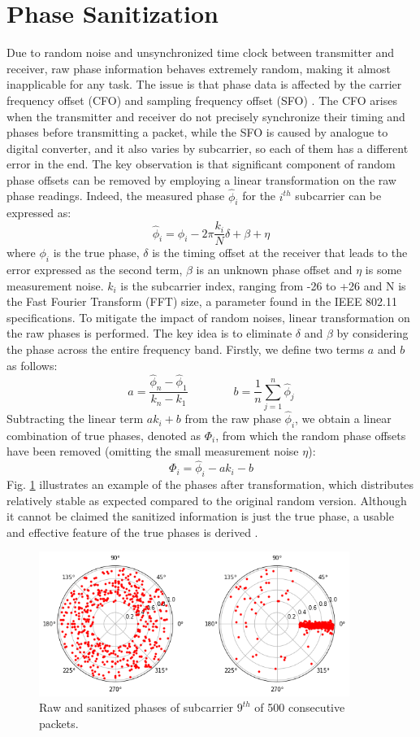 \documentclass[binding=0.7cm, oneside]{sapthesis}
\begin{document}
\section{Phase Sanitization}
\label{sec:cal}
Due to random noise and unsynchronized time clock between transmitter and receiver, raw phase information behaves extremely random, making it almost inapplicable for any task.
The issue is that phase data is affected by the carrier frequency offset (CFO) and sampling frequency offset (SFO) \cite{phase_noise}. The CFO arises when the transmitter and
receiver do not precisely synchronize their timing and phases before transmitting a packet, while the SFO is caused by analogue to digital converter, and it also varies by subcarrier, so each of them has a different
error in the end. The key observation is that significant component of random phase offsets can be removed by employing a linear transformation \cite{Phase_cal1,Phase_cal3} on the raw phase readings.
Indeed, the measured phase $\hat{\phi}_i$ for the $i^{th}$ subcarrier can be expressed as:
$$\hat{\phi}_i = {\phi}_i - 2\pi\frac{k_i}{N}\delta + \beta +\eta$$
where $\phi_i$ is the true phase, $\delta$ is the timing offset at the receiver that leads to the error expressed as the second term, $\beta$ is an unknown phase offset and $\eta$ is some measurement noise.
$k_i$ is the subcarrier index, ranging from -26 to +26 and N is the Fast Fourier Transform (FFT) size, a parameter found in the IEEE 802.11 specifications.
To mitigate the impact of random noises, linear transformation on the raw phases is performed. The key idea is to eliminate $\delta$ and $\beta$ by considering the phase across the entire frequency band. Firstly, we define two terms
$a$ and $b$ as follows:
$$ a = \frac{\hat{\phi}_n - \hat{\phi}_1}{k_n - k_1} \qquad \qquad b = \frac{1}{n}\sum_{j=1}^{n}\hat{\phi}_j$$
Subtracting the linear term $ak_i + b$ from the raw phase $\hat{\phi}_i$, we obtain a linear combination of true phases, denoted as $\Phi_i$, from which the random phase offsets have been removed (omitting the small measurement noise $\eta$):
$$\Phi_i = \hat{\phi}_i - ak_i - b $$
Fig. \ref{fig:phase_cal} illustrates an example of the phases after transformation, which distributes relatively stable as expected compared to the original random version. Although it cannot be claimed
the sanitized information is just the true phase, a usable and effective feature of the true phases is derived \cite{Phase_cal2}.
\begin{figure}[h]
    \centering
    \includegraphics[width=0.9\textwidth]{images/phaseTransform.png}
    \caption{Raw and sanitized phases of subcarrier $9^{th}$ of 500 consecutive packets.}
    \label{fig:phase_cal}
\end{figure}
\end{document}
